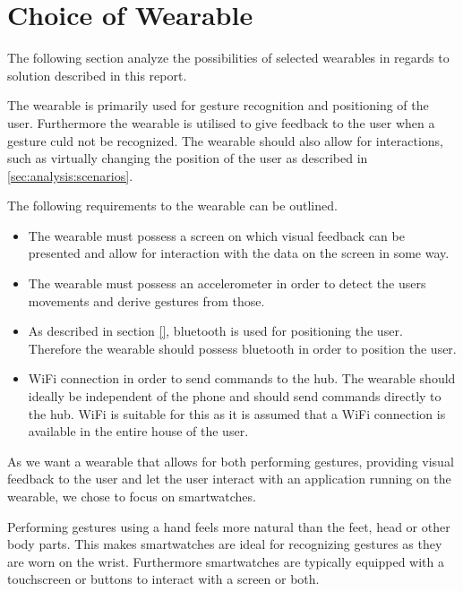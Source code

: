 \section{Choice of Wearable}
\label{sec:analysis:choice-of-wearables}

The following section analyze the possibilities of selected wearables in regards to solution described in this report.

The wearable is primarily used for gesture recognition and positioning of the user. Furthermore the wearable is utilised to give feedback to the user when a gesture culd not be recognized. The wearable should also allow for interactions, such as virtually changing the position of the user as described in \cref{sec:analysis:scenarios}.

The following requirements to the wearable can be outlined.

\begin{itemize}
\item The wearable must possess a screen on which visual feedback can be presented and allow for interaction with the data on the screen in some way.
\item The wearable must possess an accelerometer in order to detect the users movements and derive gestures from those.
\item As described in section \cref{}, bluetooth is used for positioning the user. Therefore the wearable should possess bluetooth in order to position the user. 
\item WiFi connection in order to send commands to the hub. The wearable should ideally be independent of the phone and should send commands directly to the hub. WiFi is suitable for this as it is assumed that a WiFi connection is available in the entire house of the user. \author[author=Simon]{Argument why we use a hub that uses WiFi. Reference to section on choice of hub.}
\end{itemize}

As we want a wearable that allows for both performing gestures, providing visual feedback to the user and let the user interact with an application running on the wearable, we chose to focus on smartwatches.

Performing gestures using a hand feels more natural than the feet, head or other body parts. This makes smartwatches are ideal for recognizing gestures as they are worn on the wrist. Furthermore smartwatches are typically equipped with a touchscreen or buttons to interact with a screen or both.


